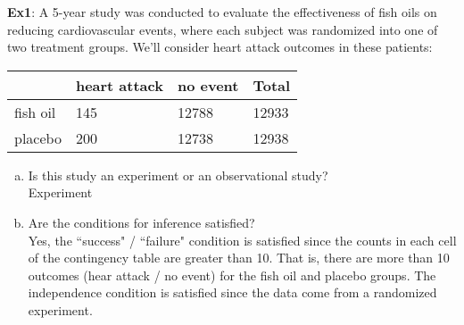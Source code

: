 \documentclass[12pt, fleqn]{article}\usepackage[]{graphicx}\usepackage[]{color}
\begin{document}
\textbf{Ex1}:  A 5-year study was conducted to evaluate the effectiveness of fish oils on reducing cardiovascular events, where each subject was randomized into one of two treatment groups.  We'll consider heart attack outcomes in these patients:\\
\begin{table}[ht!]
\begin{tabular}{llll}
\hline
& heart attack & no event & Total\\
\hline
fish oil & 145 & 12788 & 12933\\
placebo & 200 & 12738 & 12938\\
\end{tabular}
\end{table}
\begin{enumerate}[(a)]
\item Is this study an experiment or an observational study?\\
{\color{blue} Experiment}

\item Are the conditions for inference satisfied?\\
{\color{blue} Yes, the ``success" / ``failure" condition is satisfied since the counts in each cell of the contingency table are greater than 10.  That is, there are more than 10 outcomes (hear attack / no event) for the fish oil and placebo groups.  The independence condition is satisfied since the data come from a randomized experiment.}


\end{enumerate}
\end{document}
